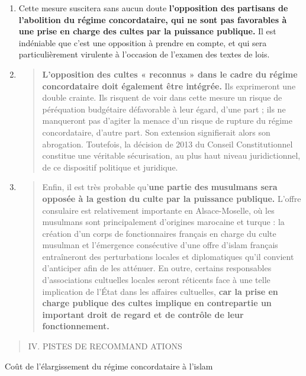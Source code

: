 \begin{enumerate}
\def\labelenumi{\alph{enumi}.}
\item
  Cette mesure suscitera sans aucun doute \textbf{l'opposition des
  partisans de l'abolition du régime concordataire, qui ne sont pas
  favorables à une prise en charge des cultes par la puissance
  publique.} Il est indéniable que c'est une opposition à prendre en
  compte, et qui sera particulièrement virulente à l'occasion de
  l'examen des textes de lois.
\item
  \begin{quote}
  \textbf{L'opposition des cultes « reconnus » dans le cadre du régime
  concordataire doit également être intégrée.} Ils exprimeront une
  double crainte. Ils risquent de voir dans cette mesure un risque de
  péréquation budgétaire défavorable à leur égard, d'une part ; ils ne
  manqueront pas d'agiter la menace d'un risque de rupture du régime
  concordataire, d'autre part. Son extension signifierait alors son
  abrogation. Toutefois, la décision de 2013 du Conseil Constitutionnel
  constitue une véritable sécurisation, au plus haut niveau
  juridictionnel, de ce dispositif politique et juridique.
  \end{quote}
\item
  \begin{quote}
  Enfin, il est très probable qu'\textbf{une partie des musulmans sera
  opposée à la gestion du culte par la puissance publique.} L'offre
  consulaire est relativement importante en Alsace-Moselle, où les
  musulmans sont principalement d'origines marocaine et turque : la
  création d'un corps de fonctionnaires français en charge du culte
  musulman et l'émergence consécutive d'une offre d'islam français
  entraîneront des perturbations locales et diplomatiques qu'il convient
  d'anticiper afin de les atténuer. En outre, certains responsables
  d'associations cultuelles locales seront réticents face à une telle
  implication de l'État dans les affaires cultuelles, \textbf{car la
  prise en charge publique des cultes implique en contrepartie un
  important droit de regard et de contrôle de leur fonctionnement.}
  \end{quote}
\end{enumerate}

\begin{quote}
IV. PISTES DE RECOMMAND ATIONS
\end{quote}

Coût de l'élargissement du régime concordataire à l'islam

